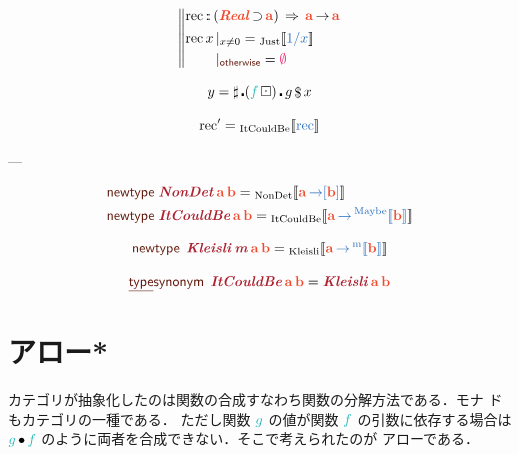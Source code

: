 \documentclass[a5paper,twoside,fleqn,draft]{jsbook}
\def\[{[\![}
\def\]{]\!]}
\def\constantColor{WildStrawberry}
\def\keywordColor{Sepia}
\def\varColor{NavyBlue}
\def\funcColor{BlueGreen}
\def\typeColor{RedOrange}
\def\typeConstColor{Maroon}
\newenvironment{leader}{\begingroup\gt}{\endgroup}
\newcommand{\mBrace}{\Vert}
\newcommand{\mKeyword}[1]{\textcolor{\keywordColor}{\mathsf{#1}}}
\newcommand{\mKeywordUnderline}[1]{\textcolor{\keywordColor}{\text{\underline{\textsf{#1}}}}}
\newcommand{\mNewTypeDeclKeyword}{\mKeyword{newtype}}
\newcommand{\mOtherwiseKeyword}{\mKeyword{otherwise}}
\newcommand{\mTypeSynonymDeclKeyword}{\mKeywordUnderline{type}\mKeyword{synonym}}
\newcommand{\mTypeConstructor}[1]{\textcolor{\typeConstColor}{\textbf{\textit{#1}}}}
\DeclareMathOperator{\mNewTypeDecl}{\mNewTypeDeclKeyword}
\DeclareMathOperator{\mOtherwise}{\mOtherwiseKeyword}
\DeclareMathOperator{\mSuperClass}{\;\Rightarrow\;}
\DeclareMathOperator{\mSuperSet}{\supset}
\DeclareMathOperator{\mTypeSynonymDecl}{\mTypeSynonymDeclKeyword}
\newcommand{\mNothing}{\textcolor{\constantColor}{\emptyset}}
\newcommand{\mVar}[1]{\textcolor{\varColor}{#1}}
\newcommand{\mFunc}[1]{\textcolor{\funcColor}{#1}}
\newcommand{\mFFunc}{{\mFunc{f}}}
\newcommand{\mGFunc}{\mFunc{g}}
\DeclareMathOperator{\mApply}{\$}
\DeclareMathOperator{\mCompFunc}{\centerdot}
\DeclareMathOperator{\mCompCat}{\bullet}
\DeclareMathOperator{\mFuncArrow}{\rightarrow}
\DeclareMathOperator{\mIn}{{:\!:}}
\DeclareMathOperator{\mMapMaybe}{\boxdot}
\newcommand{\mType}[1]{\textcolor{\typeColor}{\mathbf{#1}}}
\newcommand{\mA}{\mType{a}}
\newcommand{\mB}{\mType{b}}
\newcommand{\mTypeAssemble}[2]{{}^\mathrm{#1}\[\mType{#2}\]}
\newcommand{\mMaybeType}[1]{\mTypeAssemble{Maybe}{#1}}
\newcommand{\mValueConstructor}[1]{\mathrm{#1}}
\newcommand{\mValueWith}[2]{{}_\mValueConstructor{#1}\[\mVar{#2}\]}
\newcommand{\mJustWith}[1]{\mValueWith{Just}{#1}}
\newcommand{\mTypeClass}[1]{\textcolor{\typeColor}{\textbf{\textit{#1}}}}
\newcommand{\mRealTypeClass}{\mTypeClass{Real}}
\newcommand{\mGuard}[1]{\mathop{\mid_{#1}}}
\begin{document}
\begin{equation}
  \left\mBrace
  \begin{aligned}
    &\mathrm{rec}
    \mIn{}(\mRealTypeClass\mSuperSet\mA)
    \mSuperClass\mA\mFuncArrow\mA\\
    &
    \begin{aligned}
      \mathop{\mathrm{rec}}x&\mGuard{x\neq0}
      =\mJustWith{1/x}\\
      &\mGuard{\mOtherwise}
      =\mNothing
    \end{aligned}
  \end{aligned}
  \right.
\end{equation}

\begin{equation}
  y
  =\sharp\mCompFunc(\mFFunc\mMapMaybe)\mCompFunc g\mApply x
\end{equation}

\begin{equation}
  \mathrm{rec}'
  =\mValueWith{ItCouldBe}{\mathrm{rec}}
\end{equation}

---

\begin{align}
  \mNewTypeDecl\;
  &\mTypeConstructor{NonDet}\,\mA\,\mB
  =\mValueWith{NonDet}{\mA\mFuncArrow[\mB]}\\
  \mNewTypeDecl\;
  &\mTypeConstructor{ItCouldBe}\,\mA\,\mB
  =\mValueWith{ItCouldBe}{\mA\mFuncArrow\mMaybeType{b}}
\end{align}

\begin{equation}
  \mNewTypeDecl\;
  \mTypeConstructor{Kleisli}\,\mTypeConstructor{m}\,\mA\,\mB
  =\mValueWith{Kleisli}{\mA\mFuncArrow\mTypeAssemble{m}{\mB}}
\end{equation}

\begin{equation}
  \mTypeSynonymDecl\;
  \mTypeConstructor{ItCouldBe}\,\mA\,\mB
  =\mTypeConstructor{Kleisli}\,\mA\,\mB
\end{equation}

\chapter{アロー*}
\label{ch:arrow}

\begin{leader}
  カテゴリが抽象化したのは関数の合成すなわち関数の分解方法である．モナ
  ドもカテゴリの一種である．%
  ただし関数 $\mGFunc$ の値が関数 $\mFFunc$ の引数に依存する場合は
  $\mGFunc\mCompCat \mFFunc$ のように両者を合成できない．そこで考えられたのが
  アローである．
\end{leader}
\end{document}
